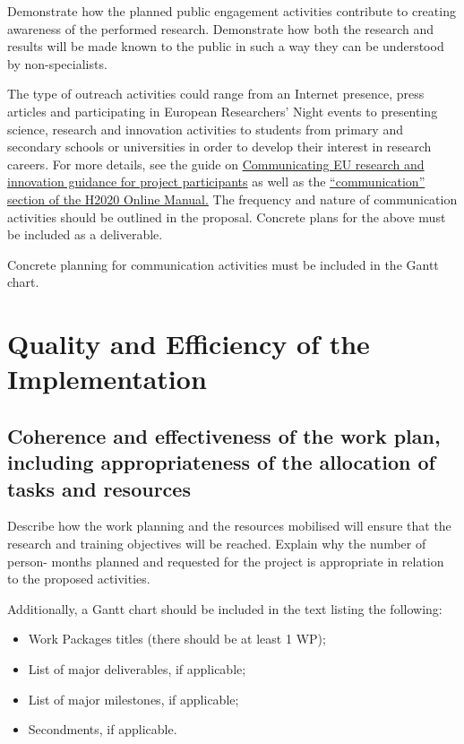 Demonstrate how the planned public engagement activities
contribute to creating awareness of the performed research.
Demonstrate how both the research and results will be made known
to the public in such a way they can be understood by
non-specialists. 

The type of outreach activities could range from an Internet
presence, press articles and participating in European
Researchers' Night events to presenting science, research and
innovation activities to students from primary and secondary
schools or universities in order to develop their interest in
research careers. For more details, see the guide on
\href{http://ec.europa.eu/research/participants/data/ref/h2020/other/gm/h2020-guide-comm_en.pdf}{Communicating
EU research and innovation guidance for project participants} as
well as the
\href{http://ec.europa.eu/research/participants/docs/h2020-funding-guide/grants/grant-management/communication_en.htm}{``communication''
section of the H2020 Online Manual.}
\medskip\noindent
The frequency and nature of communication activities should be
outlined in the proposal. Concrete plans for the above must be
included as a deliverable.

\medskip\noindent
Concrete planning for communication activities must be included in the Gantt chart.

\section{Quality and Efficiency of the Implementation}
  \label{sec:implementation}

\subsection{Coherence and effectiveness of the work plan,
including appropriateness of the allocation of tasks and
resources} 
  \label{sec:implementation_work_plan}

Describe how the work planning and the resources mobilised will
ensure that the research and training objectives will be reached.
Explain why the number of person- months planned and requested for
the project is appropriate in relation to the proposed activities.

\medskip\noindent
Additionally, a Gantt chart should be included in the text listing
the following:
\begin{itemize}
  \item Work Packages titles (there should be at least 1 WP); 
  \item List of major deliverables, if applicable;
  \item List of major milestones, if applicable;
  \item Secondments, if applicable.
\end{itemize}

